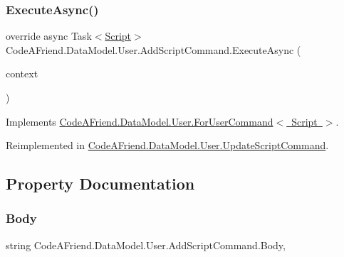 \subsubsection{\texorpdfstring{Execute\+Async()}{ExecuteAsync()}}
{\footnotesize\ttfamily override async Task$<$\mbox{\hyperlink{class_code_a_friend_1_1_data_model_1_1_script}{Script}}$>$ Code\+A\+Friend.\+Data\+Model.\+User.\+Add\+Script\+Command.\+Execute\+Async (\begin{DoxyParamCaption}\item[{Db\+Context}]{context }\end{DoxyParamCaption})\hspace{0.3cm}{\ttfamily [virtual]}}







Implements \mbox{\hyperlink{class_code_a_friend_1_1_data_model_1_1_user_1_1_for_user_command_aa9abf9da11dd2a573d8ed93bcf53f6df}{Code\+A\+Friend.\+Data\+Model.\+User.\+For\+User\+Command$<$ Script $>$}}.



Reimplemented in \mbox{\hyperlink{class_code_a_friend_1_1_data_model_1_1_user_1_1_update_script_command_a54e74e6d68bfc5e01cbcc96fd6dfbd2d}{Code\+A\+Friend.\+Data\+Model.\+User.\+Update\+Script\+Command}}.



\subsection{Property Documentation}
\mbox{\label{class_code_a_friend_1_1_data_model_1_1_user_1_1_add_script_command_a4c4f566ef6ce3878281ea811bd398234}} 
\subsubsection{\texorpdfstring{Body}{Body}}
{\footnotesize\ttfamily string Code\+A\+Friend.\+Data\+Model.\+User.\+Add\+Script\+Command.\+Body\hspace{0.3cm}{\ttfamily [get]}, {\ttfamily [set]}}



